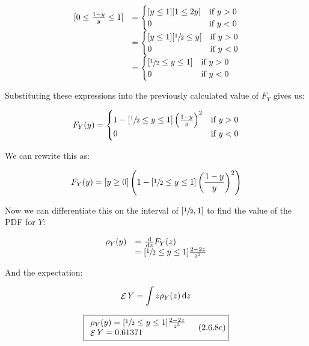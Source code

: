 \documentclass{article}
\newcommand{\subsolution}[4]{\boxed{#4\quad(\text{#1.#2#3})}}
\renewcommand{\d}[1]{\,\textnormal{d}#1}
\newcommand{\dd}[2]{\frac{\d{#1}}{\d{#2}}}
\DeclareMathOperator{\E}{\mathcal{E}}
\begin{document}
\[
\begin{array}{rl}
\lbrack 0\le \frac{1-y}{y}\le 1\rbrack &= \begin{cases}
\lbrack y\le 1\rbrack \lbrack 1\le 2y\rbrack & \text{if $y>0$} \\
0 &\text{if $y<0$} \\
\end{cases} \\

&=\begin{cases}
\lbrack y\le 1\rbrack \lbrack \sfrac{1}{2}\le y\rbrack & \text{if $y>0$} \\
0 &\text{if $y<0$} \\
\end{cases} \\

&=\begin{cases}
\lbrack \sfrac{1}{2} \le y \le 1 \rbrack & \text{if $y>0$} \\
0 &\text{if $y<0$} \\
\end{cases} \\
\end{array}
\]

Substituting these expressions into the previously calculated value of
$F_Y$ gives us:

\[
F_Y(y)=\begin{cases}
1-\lbrack \sfrac{1}{2}\le y\le 1\rbrack \left(\frac{1-y}{y}\right)^2  &\text{if $y>0$} \\
0 &\text{if $y<0$} \\
\end{cases}
\]

We can rewrite this as:

\[
F_Y(y)=\lbrack y\ge 0\rbrack \left(1 -\lbrack\sfrac{1}{2}\le y\le1\rbrack \left(\frac{1-y}{y}\right)^2\right)
\]

Now we can differentiate this on the interval of
$\lbrack\sfrac{1}{2},1\rbrack$ to find the value of the PDF for $Y$:

\[
\begin{array}{rl}
\rho_Y(y)&=\dd{}{z} F_Y(z) \\
&=\lbrack \sfrac{1}{2}\le y\le1\rbrack \frac{2-2z}{z^3} \\
\end{array}
\]

And the expectation:

\[
\E Y=\int z \rho_Y(z)\d{z}
\]

\[
\subsolution{2.6}{8}{c}{
\begin{array}{l}
\rho_Y(y)=\lbrack \sfrac{1}{2}\le y\le1\rbrack \frac{2-2z}{z^3} \\
\E Y=0.61371 \\
\end{array}}
\]
\end{document}
